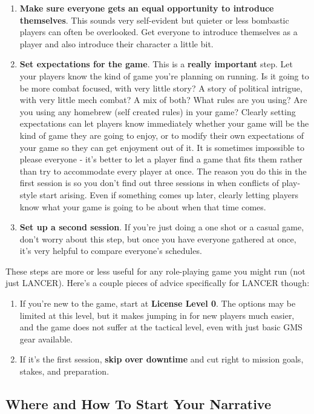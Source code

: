 \begin{enumerate}
\item \textbf{Make sure everyone gets an equal opportunity to introduce themselves}. This
sounds very self-evident but quieter or less bombastic players can often be
overlooked. Get everyone to introduce themselves as a player and also introduce
their character a little bit.
\item \textbf{Set expectations for the game}. This is a \textbf{really important} step. Let your players
know the kind of game you're planning on running. Is it going to be more combat
focused, with very little story? A story of political intrigue, with very little mech
combat? A mix of both? What rules are you using? Are you using any homebrew
(self created rules) in your game? Clearly setting expectations can let players
know immediately whether your game will be the kind of game they are going to
enjoy, or to modify their own expectations of your game so they can get
enjoyment out of it. It is sometimes impossible to please everyone - it's better to
let a player find a game that fits them rather than try to accommodate every player
at once. The reason you do this in the first session is so you don't find out three
sessions in when conflicts of play-style start arising. Even if something comes up
later, clearly letting players know what your game is going to be about when that
time comes.
\item\textbf{Set up a second session}. If you're just doing a one shot or a casual game, don't
worry about this step, but once you have everyone gathered at once, it's very
helpful to compare everyone's schedules.
\end{enumerate}

These steps are more or less useful for any role-playing game you might run (not just LANCER).
Here's a couple pieces of advice specifically for LANCER though:

\begin{enumerate}
\item If you're new to the game, start at \textbf{License Level 0}. The options may be limited at this
level, but it makes jumping in for new players much easier, and the game does not suffer
at the tactical level, even with just basic GMS gear available.
\item If it's the first session, \textbf{skip over downtime} and cut right to mission goals, stakes, and
preparation.
\end{enumerate}

\subsection{Where and How To Start Your Narrative}

